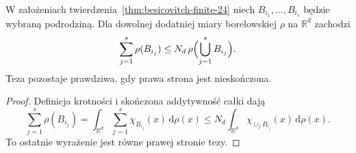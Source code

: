 \begin{wniosek}
\label{cor:finite-besicovitch-measure-24}
W założeniach twierdzenia~\ref{thm:besicovitch-finite-24}
niech $B_{i_1},\ldots,B_{i_s}$ będzie wybraną podrodziną.
Dla dowolnej dodatniej miary borelowskiej $\rho$
na $\mathbb R^d$ zachodzi
\[
 \sum_{j=1}^s\rho(B_{i_j})
 \le N_d\,\rho\Bigl(\bigcup_{j=1}^s B_{i_j}\Bigr).
\]
Teza pozostaje prawdziwa, gdy prawa strona jest nieskończona.
\end{wniosek}
\begin{proof}
Definicja krotności i skończona addytywność całki dają
\[
 \sum_{j=1}^s\rho(B_{i_j})
 =\int_{\mathbb R^d}\sum_{j=1}^s\chi_{B_{i_j}}(x)
 \,\mathrm d\rho(x)
 \le N_d\int_{\mathbb R^d}
 \chi_{\cup_jB_{i_j}}(x)\,\mathrm d\rho(x).
\]
To ostatnie wyrażenie jest równe prawej stronie tezy.
\end{proof}

